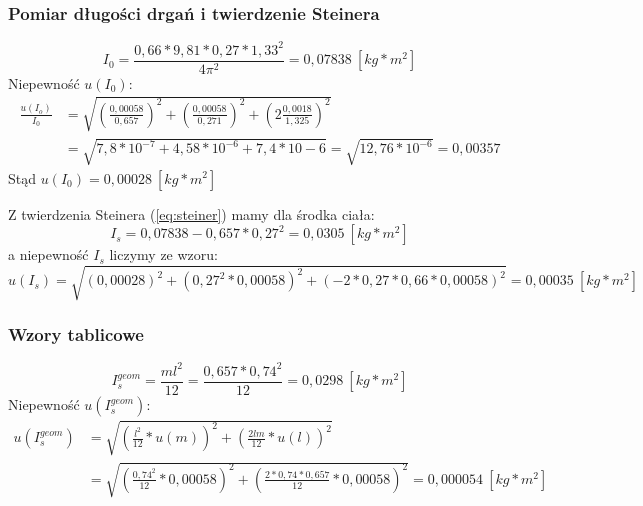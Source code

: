 \subsubsection{Pomiar długości drgań i twierdzenie Steinera}
$$I_0=\frac{0,66*9,81*0,27*1,33^2}{4\pi ^2}=0,07838~[kg*m^2]$$
Niepewność $u(I_0)$:
\begin{equation*}
\begin{split}
\frac{u(I_o)}{I_0}&=\sqrt{\left(\frac{0,00058}{0,657}\right) ^2+\left( \frac{0,00058}{0,271}\right)^2+\left(2 \frac{0,0018}{1,325}\right)^2}\\
&= \sqrt{7,8*10^{-7}+4,58*10^{-6}+7,4*10-6} = \sqrt{12,76*10^{-6}} = 0,00357
\end{split}
\end{equation*}
Stąd $u(I_0)=0,00028~[kg*m^2]$
\newline

\noindent
Z twierdzenia Steinera (\ref{eq:steiner}) mamy dla środka ciała:
$$I_s=0,07838-0,657*0,27^2=0,0305~[kg*m^2]$$
a niepewność $I_s$ liczymy ze wzoru:
$$u(I_s)=\sqrt{\left( 0,00028\right)^2+\left(0,27^2*0,00058 \right)^2+\left( -2*0,27*0,66*0,00058\right)^2}=0,00035~[kg*m^2]$$
\subsubsection{Wzory tablicowe}
$$I_{s}^{geom}=\frac{ml^2}{12}=\frac{0,657*0,74^2}{12}=0,0298~[kg*m^2]$$
Niepewność $u(I_{s}^{geom})$:
\begin{equation*}
\begin{split}
u(I_{s}^{geom})&=\sqrt{\left(\frac{l^2}{12}*u(m) \right)^2+\left(\frac{2lm}{12}*u(l) \right)^2}\\
&=\sqrt{\left (\frac{0,74^2}{12}*0,00058 \right )^2+\left (\frac{2*0,74*0,657}{12}*0,00058 \right )^2}=0,000054~[kg*m^2]
\end{split}
\end{equation*}
